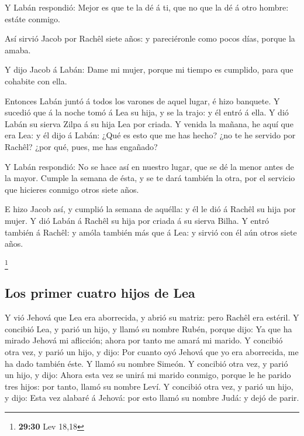  Y Labán respondió: Mejor es que te la dé á ti, que no que
la dé á otro hombre: estáte conmigo.

 Así sirvió Jacob por Rachêl siete años: y pareciéronle
como pocos días, porque la amaba.

 Y dijo Jacob á Labán: Dame mi mujer, porque mi tiempo es
cumplido, para que cohabite con ella.

 Entonces Labán juntó á todos los varones de aquel lugar, é
hizo banquete.  Y sucedió que á la noche tomó á Lea su
hija, y se la trajo: y él entró á ella.  Y dió Labán su
sierva Zilpa á su hija Lea por criada.  Y venida la mañana,
he aquí que era Lea: y él dijo á Labán: ¿Qué es esto que me has hecho?
¿no te he servido por Rachêl? ¿por qué, pues, me has engañado?

 Y Labán respondió: No se hace así en nuestro lugar, que se
dé la menor antes de la mayor.  Cumple la semana de ésta, y
se te dará también la otra, por el servicio que hicieres conmigo otros
siete años.

 E hizo Jacob así, y cumplió la semana de aquélla: y él le
dió á Rachêl su hija por mujer.  Y dió Labán á Rachêl su
hija por criada á su sierva Bilha.  Y entró también á
Rachêl: y amóla también más que á Lea: y sirvió con él aún otros siete
años.

\footnote{\textbf{29:30} Lev 18,18}

\hypertarget{los-primer-cuatro-hijos-de-lea}{%
\subsection{Los primer cuatro hijos de
Lea}\label{los-primer-cuatro-hijos-de-lea}}

 Y vió Jehová que Lea era aborrecida, y abrió su matriz:
pero Rachêl era estéril.  Y concibió Lea, y parió un hijo,
y llamó su nombre Rubén, porque dijo: Ya que ha mirado Jehová mi
aflicción; ahora por tanto me amará mi marido.  Y concibió
otra vez, y parió un hijo, y dijo: Por cuanto oyó Jehová que yo era
aborrecida, me ha dado también éste. Y llamó su nombre Simeón.
 Y concibió otra vez, y parió un hijo, y dijo: Ahora esta
vez se unirá mi marido conmigo, porque le he parido tres hijos: por
tanto, llamó su nombre Leví.  Y concibió otra vez, y parió
un hijo, y dijo: Esta vez alabaré á Jehová: por esto llamó su nombre
Judá: y dejó de parir.

